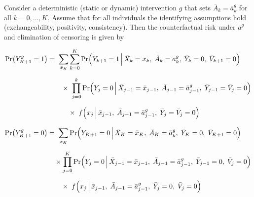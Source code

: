 \begin{tcolorbox}[title=Theorem 1: General g-formula for a time-varying treatment with elimination of censoring, breakable, enhanced jigsaw]
    \label{thm:timevarying_gformula}
    Consider a deterministic (static or dynamic) intervention $g$ that sets $\bar{A}_k = \bar{a}_k^g$ for all $k = 0,\ldots,K$. 
    Assume that for all individuals the identifying assumptions hold (exchangeability, positivity, consistency).
    Then the counterfactual risk under \(\bar{a}^g\) and elimination of censoring is given by
  
    \begin{align*}
      \Pr\bigl(Y_{K+1}^{g} = 1\bigr)
      &=\;
      \sum_{\bar{x}_K} \sum_{k=0}^K 
          \Pr\Bigl(Y_{k+1} = 1 \,\Big|\,\bar{X}_k = \bar{x}_k,\;\bar{A}_k=\bar{a}^g_k,\; \bar{Y}_k=0,\;\bar{V}_{k+1}=0 \Bigr) \\[6pt]
      &\quad\quad \times\;
      \prod_{j=0}^{k} \Pr\Bigl(Y_j=0 \,\Big|\, \bar{X}_{j-1} = \bar{x}_{j-1},\;\bar{A}_{j-1} = \bar{a}^g_{j-1},\;\bar{Y}_{j-1} = \bar{V}_j = 0 \Bigr) \\[6pt]
      &\quad\quad\quad \times\;
        f\Bigl(x_j \,\Big|\,\bar{x}_{j-1},\;\bar{A}_{j-1} = \bar{a}^g_{j-1},\; \bar{Y}_{j} =\bar{V}_j = 0 \Bigr)
    \end{align*}
        
        
    \begin{align*}
      \Pr\bigl(Y_{K+1}^{g} = 0\bigr)
      &=\;
      \sum_{\bar{x}_K} \Pr\Bigl(Y_{K+1} = 0 \,\Big|\,\bar{X}_K = \bar{x}_K,\;\bar{A}_K=\bar{a}^g_k,\; \bar{Y}_K=0,\;\bar{V}_{K+1}=0 \Bigr) \\[6pt]
      &\quad \times
      \prod_{j=0}^{K} \Pr\Bigl(Y_j=0 \,\Big|\, \bar{X}_{j-1} = \bar{x}_{j-1},\;\bar{A}_{j-1} = \bar{a}^g_{j-1},\; \bar{Y}_{j-1} = 0,\;\bar{V}_j = 0 \Bigr) \\[6pt]
      &\quad\quad \times\;
        f\Bigl(x_j \,\Big|\,\bar{x}_{j-1},\;\bar{A}_{j-1} = \bar{a}^g_{j-1},\; \bar{Y}_{j} = 0,\;\bar{V}_j = 0 \Bigr)
    \end{align*}
        
        

    \end{tcolorbox}

